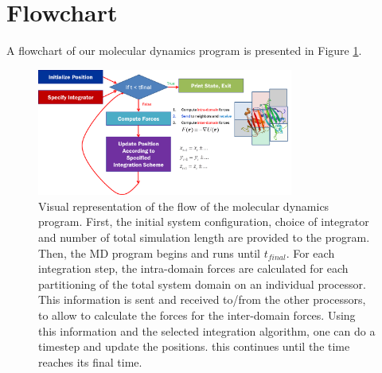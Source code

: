 \documentclass[10pt]{article}
\begin{document}


\section{Flowchart}
A flowchart of our molecular dynamics program is presented in Figure \ref{fig:flowchart}.
\begin{figure}[h]
\centering
\includegraphics[width=0.75\textwidth]{flowchart.png}
\caption{Visual representation of the flow of the molecular dynamics program. First, the initial system configuration, choice of integrator and number of total simulation length are provided to the program. Then, the MD program begins and runs until $t_{final}$. For each integration step, the intra-domain forces are calculated for each partitioning of the total system domain on an individual processor. This information is sent and received to/from the other processors, to allow to calculate the forces for the inter-domain forces. Using this information and the selected integration algorithm, one can do a timestep and update the positions. this continues until the time reaches its final time.}
\label{fig:flowchart}
\end{figure}


\end{document}
